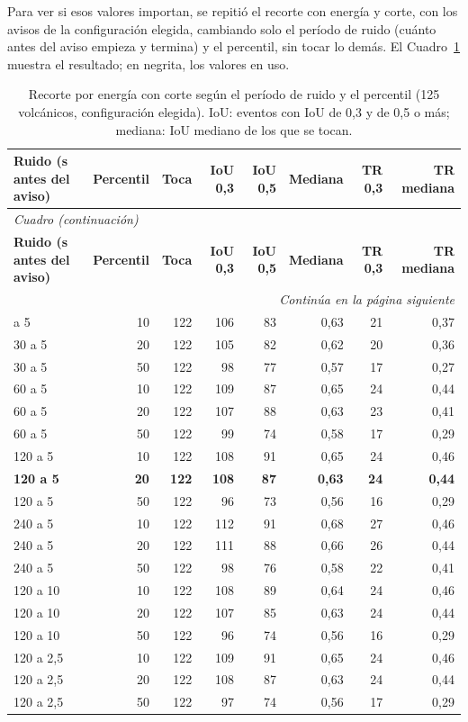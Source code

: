 \documentclass[11pt,a4paper,oneside,spanish,oldfontcommands]{memoir}
\newcommand{\cabecera}[2]{%
  \toprule #1 \\ \midrule \endfirsthead
  \multicolumn{#2}{l}{\itshape Cuadro \thetable{} (continuación)}\\
  \toprule #1 \\ \midrule \endhead
  \midrule \multicolumn{#2}{r}{\itshape Continúa en la página siguiente}\\ \endfoot
  \bottomrule \endlastfoot}
\begin{document}
Para ver si esos valores importan, se repitió el recorte con energía y corte,
con los avisos de la configuración elegida, cambiando solo el período de ruido
(cuánto antes del aviso empieza y termina) y el percentil, sin tocar lo demás.
El Cuadro~\ref{tab:ruido} muestra el resultado; en negrita, los valores en uso.

{\small
\setlength{\tabcolsep}{4pt}
\begin{longtable}{lrrrrrrr}
\caption{Recorte por energía con corte según el período de ruido y el percentil (125 volcánicos, configuración elegida). IoU: eventos con IoU de 0,3 y de 0,5 o más; mediana: IoU mediano de los que se tocan.}\label{tab:ruido}\\
\cabecera{\textbf{Ruido (s antes del aviso)} & \textbf{Percentil} & \textbf{Toca} & \textbf{IoU 0,3} & \textbf{IoU 0,5} & \textbf{Mediana} & \textbf{TR 0,3} & \textbf{TR mediana}}{8}
30 a 5 & 10 & 122 & 106 & 83 & 0,63 & 21 & 0,37 \\
30 a 5 & 20 & 122 & 105 & 82 & 0,62 & 20 & 0,36 \\
30 a 5 & 50 & 122 & 98 & 77 & 0,57 & 17 & 0,27 \\
\midrule
60 a 5 & 10 & 122 & 109 & 87 & 0,65 & 24 & 0,44 \\
60 a 5 & 20 & 122 & 107 & 88 & 0,63 & 23 & 0,41 \\
60 a 5 & 50 & 122 & 99 & 74 & 0,58 & 17 & 0,29 \\
\midrule
120 a 5 & 10 & 122 & 108 & 91 & 0,65 & 24 & 0,46 \\
\textbf{120 a 5} & \textbf{20} & \textbf{122} & \textbf{108} & \textbf{87} & \textbf{0,63} & \textbf{24} & \textbf{0,44} \\
120 a 5 & 50 & 122 & 96 & 73 & 0,56 & 16 & 0,29 \\
\midrule
240 a 5 & 10 & 122 & 112 & 91 & 0,68 & 27 & 0,46 \\
240 a 5 & 20 & 122 & 111 & 88 & 0,66 & 26 & 0,44 \\
240 a 5 & 50 & 122 & 98 & 76 & 0,58 & 22 & 0,41 \\
\midrule
120 a 10 & 10 & 122 & 108 & 89 & 0,64 & 24 & 0,46 \\
120 a 10 & 20 & 122 & 107 & 85 & 0,63 & 24 & 0,44 \\
120 a 10 & 50 & 122 & 96 & 74 & 0,56 & 16 & 0,29 \\
\midrule
120 a 2,5 & 10 & 122 & 109 & 91 & 0,65 & 24 & 0,46 \\
120 a 2,5 & 20 & 122 & 108 & 87 & 0,63 & 24 & 0,44 \\
120 a 2,5 & 50 & 122 & 97 & 74 & 0,56 & 17 & 0,29 \\
\end{longtable}
}
\end{document}

